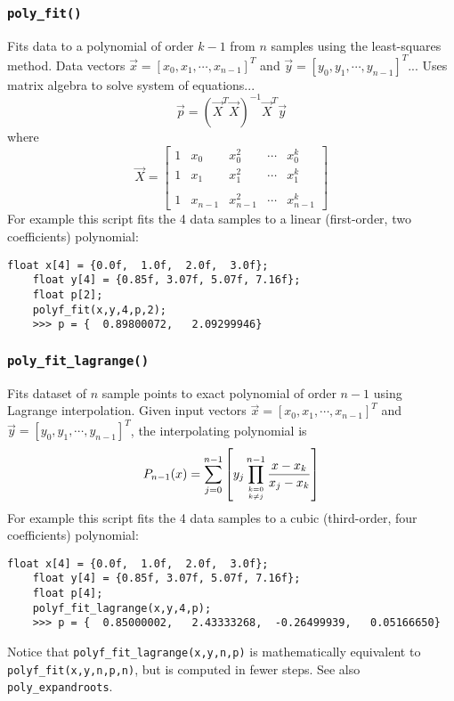 \subsubsection{{\tt poly\_fit()}}
Fits data to a polynomial of order $k-1$ from $n$ samples using the
least-squares method.
Data vectors
$\vec{x}=[x_0,x_1,\cdots,x_{n-1}]^T$ and 
$\vec{y}=[y_0,y_1,\cdots,y_{n-1}]^T$...
Uses matrix algebra to solve system of equations...
\[
    \vec{p} = \left(\vec{X}^T\vec{X}\right)^{-1}\vec{X}^T\vec{y}
\]
where
\[
    \vec{X} = 
    \begin{bmatrix}
        1   & x_0       & x_0^2     & \cdots    & x_0^{k}     \\
        1   & x_1       & x_1^2     & \cdots    & x_1^{k}     \\
        \\
        1   & x_{n-1}   & x_{n-1}^2 & \cdots    & x_{n-1}^{k}
    \end{bmatrix}
\]
%
For example this script fits the 4 data samples to a linear
(first-order, two coefficients) polynomial:
%
\begin{Verbatim}[fontsize=\small]
    float x[4] = {0.0f,  1.0f,  2.0f,  3.0f};
    float y[4] = {0.85f, 3.07f, 5.07f, 7.16f};
    float p[2];
    polyf_fit(x,y,4,p,2);
    >>> p = {  0.89800072,   2.09299946}
\end{Verbatim}


\subsubsection{{\tt poly\_fit\_lagrange()}}
Fits dataset of $n$ sample points to exact polynomial of order $n-1$ using
Lagrange interpolation.
Given input vectors
$\vec{x}=[x_0,x_1,\cdots,x_{n-1}]^T$ and 
$\vec{y}=[y_0,y_1,\cdots,y_{n-1}]^T$, the interpolating polynomial is
\[
    P_{n-1}(x) =
        \sum_{j=0}^{n-1} {
            \left[
            y_j
            \prod_{{k=0}\atop{k \ne j}}^{n-1} {
                \frac{x-x_k}{x_j-x_k}
            }
            \right]
        }
\]
%
For example this script fits the 4 data samples to a cubic
(third-order, four coefficients) polynomial:
%
\begin{Verbatim}[fontsize=\small]
    float x[4] = {0.0f,  1.0f,  2.0f,  3.0f};
    float y[4] = {0.85f, 3.07f, 5.07f, 7.16f};
    float p[4];
    polyf_fit_lagrange(x,y,4,p);
    >>> p = {  0.85000002,   2.43333268,  -0.26499939,   0.05166650}
\end{Verbatim}
%
Notice that {\tt polyf\_fit\_lagrange(x,y,n,p)}
is mathematically equivalent to {\tt polyf\_fit(x,y,n,p,n)},
but is computed in fewer steps.
%
See also {\tt poly\_expandroots}.

